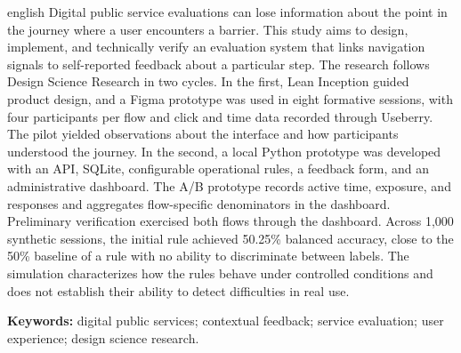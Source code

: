 \begin{resumo}[Abstract]
\begin{otherlanguage*}{english}
Digital public service evaluations can lose information about the point in the journey where a user encounters a barrier. This study aims to design, implement, and technically verify an evaluation system that links navigation signals to self-reported feedback about a particular step. The research follows Design Science Research in two cycles. In the first, Lean Inception guided product design, and a Figma prototype was used in eight formative sessions, with four participants per flow and click and time data recorded through Useberry. The pilot yielded observations about the interface and how participants understood the journey. In the second, a local Python prototype was developed with an API, SQLite, configurable operational rules, a feedback form, and an administrative dashboard. The A/B prototype records active time, exposure, and responses and aggregates flow-specific denominators in the dashboard. Preliminary verification exercised both flows through the dashboard. Across 1,000 synthetic sessions, the initial rule achieved 50.25\% balanced accuracy, close to the 50\% baseline of a rule with no ability to discriminate between labels. The simulation characterizes how the rules behave under controlled conditions and does not establish their ability to detect difficulties in real use.

\vspace{\onelineskip}
\noindent \textbf{Keywords:} digital public services; contextual feedback; service evaluation; user experience; design science research.
\end{otherlanguage*}
\end{resumo}

